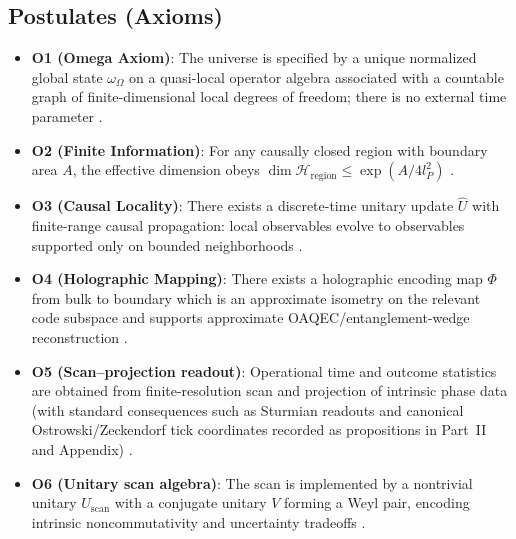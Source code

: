 \subsection{Postulates (Axioms)}
\begin{itemize}
    \item \textbf{O1 (Omega Axiom)}: The universe is specified by a unique normalized global state $\omega_\Omega$ on a quasi-local operator algebra associated with a countable graph of finite-dimensional local degrees of freedom; there is no external time parameter \cite{BratteliRobinson1987OAQSM1}.
    \item \textbf{O2 (Finite Information)}: For any causally closed region with boundary area $A$, the effective dimension obeys $\dim \mathcal{H}_{\mathrm{region}} \le \exp(A/4l_P^2)$ \cite{bekenstein1973black,hawking1975particle,thooft1993dimensional,susskind1995world,Bousso2002}.
    \item \textbf{O3 (Causal Locality)}: There exists a discrete-time unitary update $\hat{U}$ with finite-range causal propagation: local observables evolve to observables supported only on bounded neighborhoods \cite{Watrous1995QCA,SchumacherWerner2004,Dariano2014}.
    \item \textbf{O4 (Holographic Mapping)}: There exists a holographic encoding map $\Phi$ from bulk to boundary which is an approximate isometry on the relevant code subspace and supports approximate OAQEC/entanglement-wedge reconstruction \cite{AlmheiriDongHarlow2015,Pastawski2015,Harlow2017}.
    \item \textbf{O5 (Scan--projection readout)}: Operational time and outcome statistics are obtained from finite-resolution scan and projection of intrinsic phase data (with standard consequences such as Sturmian readouts and canonical Ostrowski/Zeckendorf tick coordinates recorded as propositions in Part~II and Appendix) \cite{MorseHedlund1940,Lothaire2002,Zeckendorf1972,AlloucheShallit2003,Ma2025HPA}.
    \item \textbf{O6 (Unitary scan algebra)}: The scan is implemented by a nontrivial unitary $U_{\mathrm{scan}}$ with a conjugate unitary $V$ forming a Weyl pair, encoding intrinsic noncommutativity and uncertainty tradeoffs \cite{Weyl1916,Rieffel1981IrrationalRotations}.
\end{itemize}

